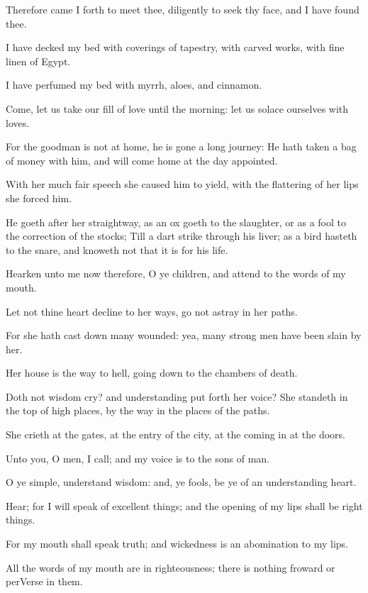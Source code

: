 \Verse Therefore came I forth to meet thee, diligently to seek thy face, and I have found thee.

\Verse I have decked my bed with coverings of tapestry, with carved works, with fine linen of Egypt.

\Verse I have perfumed my bed with myrrh, aloes, and cinnamon.

\Verse Come, let us take our fill of love until the morning: let us solace ourselves with loves.

\Verse For the goodman is not at home, he is gone a long journey: \Verse He hath taken a bag of money with him, and will come home at the day appointed.

\Verse With her much fair speech she caused him to yield, with the flattering of her lips she forced him.

\Verse He goeth after her straightway, as an ox goeth to the slaughter, or as a fool to the correction of the stocks; \Verse Till a dart strike through his liver; as a bird hasteth to the snare, and knoweth not that it is for his life.

\Verse Hearken unto me now therefore, O ye children, and attend to the words of my mouth.

\Verse Let not thine heart decline to her ways, go not astray in her paths.

\Verse For she hath cast down many wounded: yea, many strong men have been slain by her.

\Verse Her house is the way to hell, going down to the chambers of death.


\Chapter
\Verse Doth not wisdom cry? and understanding put forth her voice?  \Verse She standeth in the top of high places, by the way in the places of the paths.

\Verse She crieth at the gates, at the entry of the city, at the coming in at the doors.

\Verse Unto you, O men, I call; and my voice is to the sons of man.

\Verse O ye simple, understand wisdom: and, ye fools, be ye of an understanding heart.

\Verse Hear; for I will speak of excellent things; and the opening of my lips shall be right things.

\Verse For my mouth shall speak truth; and wickedness is an abomination to my lips.

\Verse All the words of my mouth are in righteousness; there is nothing froward or perVerse in them.

